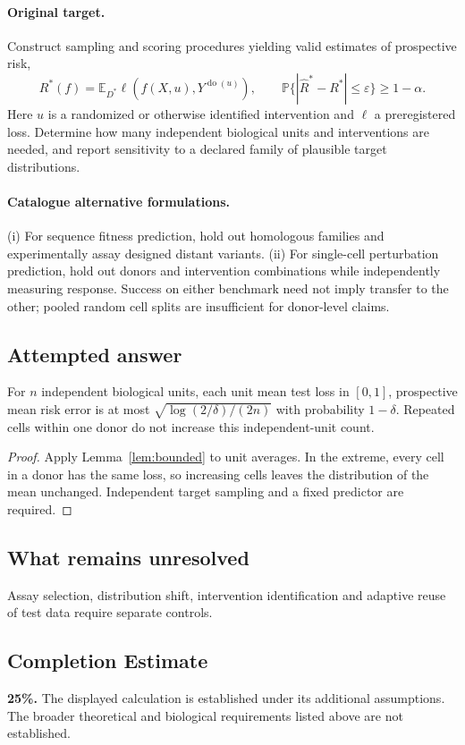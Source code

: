\documentclass[11pt]{article}
\begin{document}
\paragraph{Original target.}
Construct sampling and scoring procedures yielding valid estimates of prospective risk,
\[R^*(f)=\mathbb{E}_{D^*}\ell(f(X,u),Y^{\operatorname{do}(u)}),\qquad \mathbb{P}\{|\widehat R^*-R^*|\le\varepsilon\}\ge1-\alpha.\]
Here $u$ is a randomized or otherwise identified intervention and $\ell$ a preregistered loss. Determine how many independent biological units and interventions are needed, and report sensitivity to a declared family of plausible target distributions.
\paragraph{Catalogue alternative formulations.}
(i) For sequence fitness prediction, hold out homologous families and experimentally assay designed distant variants. (ii) For single-cell perturbation prediction, hold out donors and intervention combinations while independently measuring response. Success on either benchmark need not imply transfer to the other; pooled random cell splits are insufficient for donor-level claims.
\subsection{Attempted answer}
\begin{proposition}
For $n$ independent biological units, each unit mean test loss in $[0,1]$, prospective mean risk error is at most $\sqrt{\log(2/\delta)/(2n)}$ with probability $1-\delta$. Repeated cells within one donor do not increase this independent-unit count.
\end{proposition}
\begin{proof}
Apply Lemma~\ref{lem:bounded} to unit averages. In the extreme, every cell in a donor has the same loss, so increasing cells leaves the distribution of the mean unchanged. Independent target sampling and a fixed predictor are required.
\end{proof}
\subsection{What remains unresolved}
Assay selection, distribution shift, intervention identification and adaptive reuse of test data require separate controls.
\subsection{Completion Estimate}
\textbf{25\%.} The displayed calculation is established under its additional assumptions. The broader theoretical and biological requirements listed above are not established.
\end{document}
